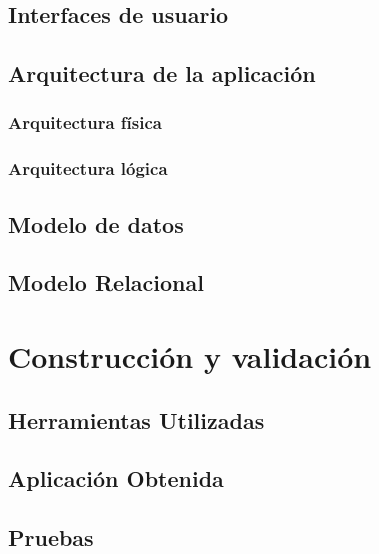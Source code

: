 \documentclass{iccmemoria}
\begin{document}
	\section{Interfaces de usuario}
	

	\section{Arquitectura de la aplicación}
	

		\subsection{Arquitectura física}
		

		\subsection{Arquitectura lógica}
		\label{sec:Arquitectura_Logica}
		

	\section{Modelo de datos}
	

	\section{Modelo Relacional}
	

\chapter{Construcción y validación}


	\section{Herramientas Utilizadas}
	

	\section{Aplicación Obtenida}
	

	\section{Pruebas}
	
\end{document}
